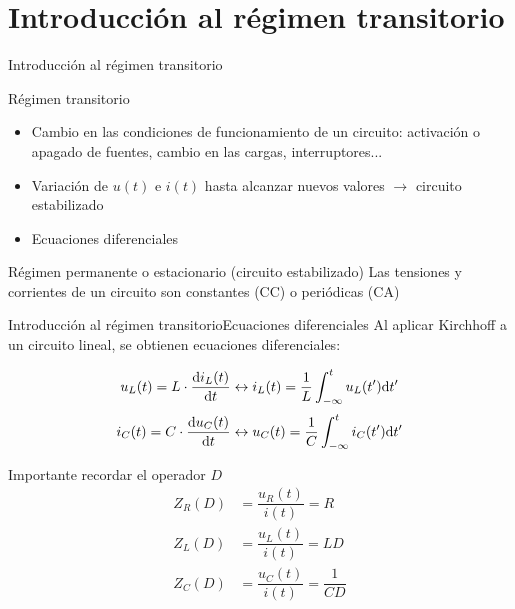 \documentclass[aspectratio=169, xcolor={usenames,svgnames,dvipsnames}]{beamer}
\begin{document}
\section{Introducción al régimen transitorio}

\begin{frame}{Introducción al régimen transitorio}
\begin{block}{Régimen transitorio}
\begin{itemize}
\item Cambio en las condiciones de funcionamiento de un circuito: activación o apagado de fuentes, cambio en las cargas, interruptores...
\item Variación de $u(t)$ e $i(t)$ hasta alcanzar nuevos valores $\rightarrow$ circuito estabilizado
\item \alert{Ecuaciones diferenciales}
\end{itemize}
\end{block}
\begin{block}{Régimen permanente o estacionario (circuito estabilizado)}
Las tensiones y corrientes de un circuito son constantes (CC) o periódicas (CA)
\end{block}
\end{frame}

\begin{frame}{Introducción al régimen transitorio}{Ecuaciones diferenciales}
Al aplicar Kirchhoff a un circuito lineal, se obtienen ecuaciones diferenciales: 

\[
  u_L(t) = L \cdot \diff{i_L(t)}{t}
  \leftrightarrow
  i_L(t) = \frac{1}{L} \int^t_{-\infty}u_L(t') \mathrm{d}t'
\]
\[
  i_C(t) = C \cdot \diff{u_C(t)}{t}
  \leftrightarrow
  u_C(t) = \frac{1}{C} \int^t_{-\infty}i_C(t') \mathrm{d}t'
\]

\alert{Importante recordar el operador $D$}
\begin{align*}
	    Z_R(D)&=\dfrac{u_R(t)}{i(t)}=R\\
	    Z_L(D)&=\dfrac{u_L(t)}{i(t)}=LD\\
	    Z_C(D)&=\dfrac{u_C(t)}{i(t)}=\dfrac{1}{CD}
	\end{align*}
\end{frame}
\end{document}
